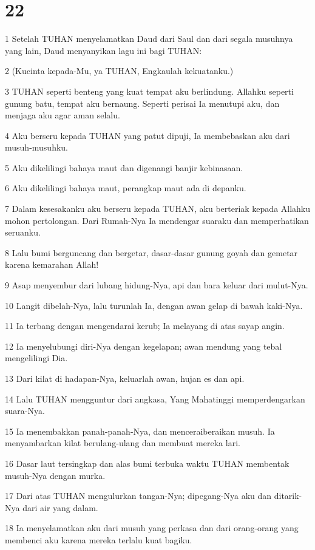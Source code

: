 \chapter{22}

\par 1 Setelah TUHAN menyelamatkan Daud dari Saul dan dari segala musuhnya yang lain, Daud menyanyikan lagu ini bagi TUHAN:
\par 2 (Kucinta kepada-Mu, ya TUHAN, Engkaulah kekuatanku.)
\par 3 TUHAN seperti benteng yang kuat tempat aku berlindung. Allahku seperti gunung batu, tempat aku bernaung. Seperti perisai Ia menutupi aku, dan menjaga aku agar aman selalu.
\par 4 Aku berseru kepada TUHAN yang patut dipuji, Ia membebaskan aku dari musuh-musuhku.
\par 5 Aku dikelilingi bahaya maut dan digenangi banjir kebinasaan.
\par 6 Aku dikelilingi bahaya maut, perangkap maut ada di depanku.
\par 7 Dalam kesesakanku aku berseru kepada TUHAN, aku berteriak kepada Allahku mohon pertolongan. Dari Rumah-Nya Ia mendengar suaraku dan memperhatikan seruanku.
\par 8 Lalu bumi berguncang dan bergetar, dasar-dasar gunung goyah dan gemetar karena kemarahan Allah!
\par 9 Asap menyembur dari lubang hidung-Nya, api dan bara keluar dari mulut-Nya.
\par 10 Langit dibelah-Nya, lalu turunlah Ia, dengan awan gelap di bawah kaki-Nya.
\par 11 Ia terbang dengan mengendarai kerub; Ia melayang di atas sayap angin.
\par 12 Ia menyelubungi diri-Nya dengan kegelapan; awan mendung yang tebal mengelilingi Dia.
\par 13 Dari kilat di hadapan-Nya, keluarlah awan, hujan es dan api.
\par 14 Lalu TUHAN mengguntur dari angkasa, Yang Mahatinggi memperdengarkan suara-Nya.
\par 15 Ia menembakkan panah-panah-Nya, dan menceraiberaikan musuh. Ia menyambarkan kilat berulang-ulang dan membuat mereka lari.
\par 16 Dasar laut tersingkap dan alas bumi terbuka waktu TUHAN membentak musuh-Nya dengan murka.
\par 17 Dari atas TUHAN mengulurkan tangan-Nya; dipegang-Nya aku dan ditarik-Nya dari air yang dalam.
\par 18 Ia menyelamatkan aku dari musuh yang perkasa dan dari orang-orang yang membenci aku karena mereka terlalu kuat bagiku.
